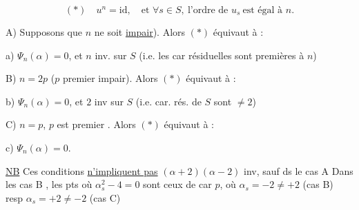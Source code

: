 
\[
(*)\quad u^n=\mathrm{id},\quad\text{et }\forall s\in S,\ \text{l'ordre de }u_s\ \text{est égal à }n.
\]

A) Supposons que $n$ ne soit  
  \uline{impair}). Alors $(*)$ équivaut à :

a) $\Psi_n(\alpha)=0$, et $n$ inv. sur $S$ (i.e. les car résiduelles
sont premières à $n$)


B) $n=2p$ ($p$ premier impair). Alors $(*)$ équivaut à :

b) $\Psi_n(\alpha)=0$, et $2$ inv sur $S$ (i.e. car. rés. de $S$
sont $\ne2$)


C) $n=p$, $p$ est premier . Alors $(*)$ équivaut à :

c) $\Psi_n(\alpha)=0$.

\uline{NB} Ces conditions \uline{n'impliquent pas} $(\alpha+2)(\alpha-2)$ inv, sauf ds le cas A
Dans les cas B  , les pts où $\alpha_s^2-4=0$ sont ceux de car $p$,
\deleted{(où $\alpha_s=-2\ne2$] (resp. ceux de car} où $\alpha_s=-2\ne+2$ (cas B) resp $\alpha_s=+2\ne-2$ (cas C)
